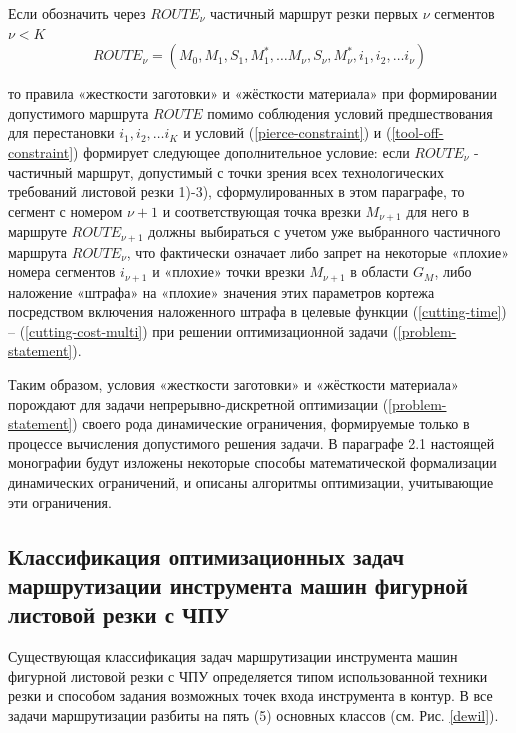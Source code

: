 \documentclass{article}
\begin{document}
Если обозначить через
$ROUTE_\nu$
частичный маршрут резки первых $\nu$
сегментов
$\nu < K$
\begin{equation}
  ROUTE_\nu = (M_0, M_1, S_1, M_1^*, \dots M_\nu, S_\nu, M_\nu^*, i_1, i_2, \dots i_\nu)
\end{equation}

то правила «жесткости заготовки» и «жёсткости материала»
при формировании допустимого маршрута
$ROUTE$
помимо соблюдения условий предшествования для перестановки
$i_1, i_2, \dots i_K$
и условий (\ref{pierce-constraint}) и (\ref{tool-off-constraint})
формирует следующее дополнительное условие:
если
$ROUTE_\nu$ - частичный маршрут,
допустимый с точки зрения всех технологических
требований листовой резки 1)-3),
сформулированных в этом параграфе,
то сегмент с номером $\nu+1$
и соответствующая точка врезки $M_{\nu+1}$
для него в маршруте
$ROUTE_{\nu+1}$
должны выбираться с учетом уже выбранного частичного маршрута
$ROUTE_\nu$,
что фактически означает либо запрет
на некоторые «плохие» номера сегментов
$i_{\nu+1}$
и «плохие» точки врезки
$M_{\nu+1}$
в области  $G_M$,
либо наложение «штрафа» на «плохие» значения
этих параметров кортежа
посредством включения наложенного штрафа в целевые функции
(\ref{cutting-time}) – (\ref{cutting-cost-multi})
при решении оптимизационной задачи (\ref{problem-statement}).

Таким образом,
условия «жесткости заготовки» и «жёсткости материала»
порождают для задачи непрерывно-дискретной оптимизации (\ref{problem-statement})
своего рода динамические ограничения,
формируемые только в процессе вычисления допустимого решения задачи.
В параграфе 2.1
настоящей монографии будут изложены
некоторые способы математической формализации динамических ограничений,
и описаны алгоритмы оптимизации,
учитывающие эти ограничения.

\subsection{Классификация оптимизационных задач маршрутизации инструмента машин фигурной листовой резки с ЧПУ}

Существующая  классификация задач маршрутизации инструмента
машин фигурной листовой резки с ЧПУ определяется
типом использованной техники резки и способом задания
возможных точек входа инструмента в контур.
В \cite{intro13}
все задачи маршрутизации разбиты на пять (5) основных классов
(см. Рис. \ref{dewil}).
\end{document}
